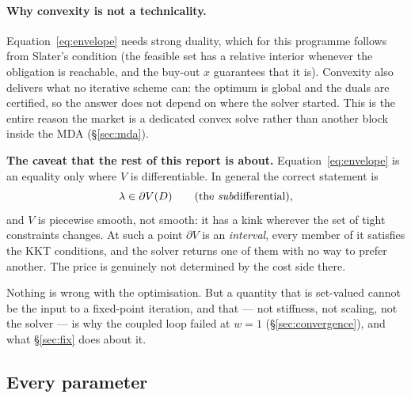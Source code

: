 \documentclass[11pt,a4paper]{article}
\begin{document}
\paragraph{Why convexity is not a technicality.} Equation~\eqref{eq:envelope} needs
strong duality, which for this programme follows from Slater's condition (the feasible
set has a relative interior whenever the obligation is reachable, and the buy-out $x$
guarantees that it is). Convexity also delivers what no iterative scheme can: the
optimum is global and the duals are certified, so the answer does not depend on where
the solver started. This is the entire reason the market is a dedicated convex solve
rather than another block inside the MDA (\S\ref{sec:mda}).

\begin{keybox}
\textbf{The caveat that the rest of this report is about.} Equation~\eqref{eq:envelope}
is an equality only where $V$ is differentiable. In general the correct statement is
\[
\lambda \in \partial V(D) \qquad\text{(the \emph{sub}differential)},
\]
and $V$ is piecewise smooth, not smooth: it has a kink wherever the set of tight
constraints changes. At such a point $\partial V$ is an \emph{interval}, every member of
it satisfies the KKT conditions, and the solver returns one of them with no way to
prefer another. The price is genuinely not determined by the cost side there.

Nothing is wrong with the optimisation. But a quantity that is set-valued cannot be the
input to a fixed-point iteration, and that --- not stiffness, not scaling, not the
solver --- is why the coupled loop failed at $w=1$ (\S\ref{sec:convergence}), and what
\S\ref{sec:fix} does about it.
\end{keybox}

\subsection{Every parameter}
\label{sec:parameters}
\end{document}
